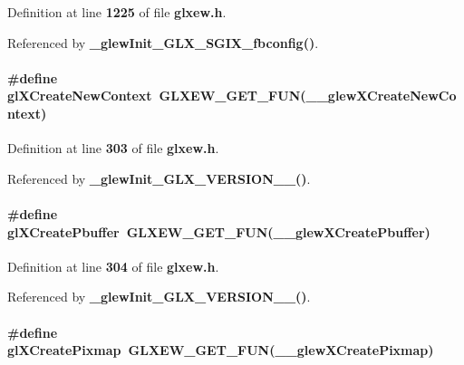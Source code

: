 Definition at line {\bf 1225} of file {\bf glxew.\+h}.



Referenced by {\bf \+\_\+glew\+Init\+\_\+\+G\+L\+X\+\_\+\+S\+G\+I\+X\+\_\+fbconfig()}.

\paragraph[{gl\+X\+Create\+New\+Context}]{\setlength{\rightskip}{0pt plus 5cm}\#define gl\+X\+Create\+New\+Context~{\bf G\+L\+X\+E\+W\+\_\+\+G\+E\+T\+\_\+\+F\+UN}({\bf \+\_\+\+\_\+glew\+X\+Create\+New\+Context})}\label{glxew_8h_aae1648b02e83a3d02b5db6bf488f21d2}


Definition at line {\bf 303} of file {\bf glxew.\+h}.



Referenced by {\bf \+\_\+glew\+Init\+\_\+\+G\+L\+X\+\_\+\+V\+E\+R\+S\+I\+O\+N\+\_\+\_()}.

\paragraph[{gl\+X\+Create\+Pbuffer}]{\setlength{\rightskip}{0pt plus 5cm}\#define gl\+X\+Create\+Pbuffer~{\bf G\+L\+X\+E\+W\+\_\+\+G\+E\+T\+\_\+\+F\+UN}({\bf \+\_\+\+\_\+glew\+X\+Create\+Pbuffer})}\label{glxew_8h_a5797b03118c9779f1b0706e614a3e345}


Definition at line {\bf 304} of file {\bf glxew.\+h}.



Referenced by {\bf \+\_\+glew\+Init\+\_\+\+G\+L\+X\+\_\+\+V\+E\+R\+S\+I\+O\+N\+\_\+\_()}.

\paragraph[{gl\+X\+Create\+Pixmap}]{\setlength{\rightskip}{0pt plus 5cm}\#define gl\+X\+Create\+Pixmap~{\bf G\+L\+X\+E\+W\+\_\+\+G\+E\+T\+\_\+\+F\+UN}({\bf \+\_\+\+\_\+glew\+X\+Create\+Pixmap})}\label{glxew_8h_a32c0ab25e4b3e902aee1b110f113cd86}


